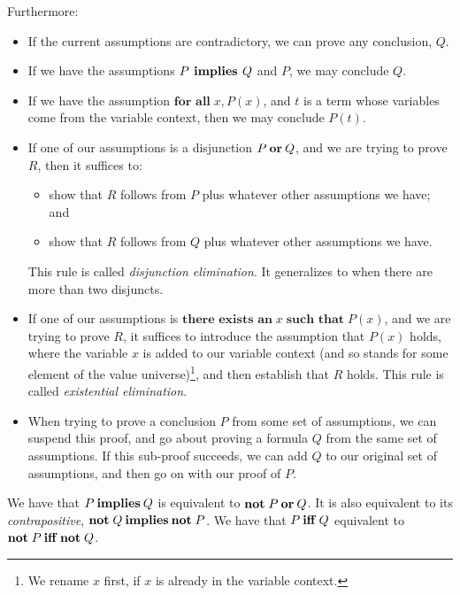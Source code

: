 Furthermore:
\begin{itemize}
\item If the current assumptions are contradictory, we can prove
%
%
  any conclusion, $Q$.

\item If we have the assumptions $P \,\mathbin{\mathbf{implies}}\, Q$ and $P$, we
  may conclude $Q$.

\item If we have the assumption $\textbf{for all}\; x, P(x)$, and $t$ is
  a term whose variables come from the variable context, then
  we may conclude $P(t)$.

\item If one of our assumptions is a disjunction $P \mathbin{\mathbf{or}} Q$,
  and we are trying to prove $R$, then it suffices to:
  \begin{itemize}
  \item show that $R$ follows from $P$ plus whatever other assumptions
    we have; and
  \item show that $R$ follows from $Q$ plus whatever other assumptions
    we have.
  \end{itemize}
  This rule is called \emph{disjunction elimination}. It generalizes
%
%
  to when there are more than two disjuncts.

\item If one of our assumptions is $\textbf{there exists an}\; x
  \;\textbf{such that}\; P(x)$, and we are trying to prove $R$, it
  suffices to introduce the assumption that $P(x)$ holds, where the
  variable $x$ is added to our variable context (and so stands for
  some element of the value universe)\footnote{We rename $x$ first,
  if $x$ is already in the variable context.}, and then establish that $R$
  holds. This rule is called \emph{existential elimination}.
%
%

\item When trying to prove a conclusion $P$ from some set of assumptions,
  we can suspend this proof, and go about proving a formula $Q$ from
  the same set of assumptions. If this sub-proof succeeds, we can
%
%
  add $Q$ to our original set of assumptions, and then go on with
  our proof of $P$.
\end{itemize}

We have that $P \mathbin{\mathbf{implies}} Q$ is equivalent to
$\textbf{not}\; P \mathbin{\mathbf{or}} Q$.  It is also equivalent to its
\emph{contrapositive},
%
%
$\textbf{not}\; Q \mathbin{\mathbf{implies}} \textbf{not}\; P$.
We have that $P \mathbin{\mathbf{iff}} Q$ equivalent to
$\textbf{not}\;P\mathbin{\mathbf{iff}} \textbf{not}\;Q$.

